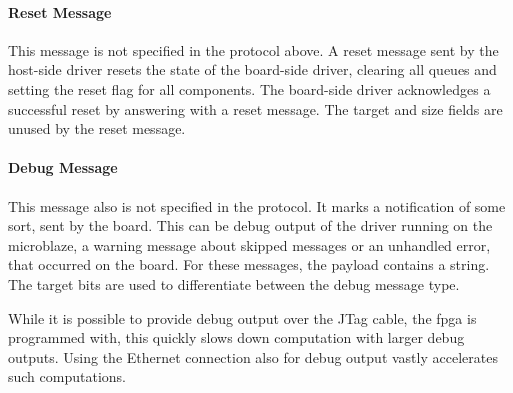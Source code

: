 \documentclass{report}
\begin{document}
\paragraph{Reset Message}
This message is not specified in the protocol above. A reset message sent by the host-side driver resets the state of the board-side driver, clearing all queues and setting the reset flag for all components. The board-side driver acknowledges a successful reset by answering with a reset message. 
The target and size fields are unused by the reset message.

\paragraph{Debug Message}
This message also is not specified in the protocol. It marks a notification of some sort, sent by the board. This can be debug output of the driver running on the microblaze, a warning message about skipped messages or an unhandled error, that occurred on the board. For these messages, the payload contains a string. The target bits are used to differentiate between the debug message type. %

While it is possible to provide debug output over the JTag cable, the fpga is programmed with, this quickly slows down computation with larger debug outputs. Using the Ethernet connection also for debug output vastly accelerates such computations.



\end{document}
